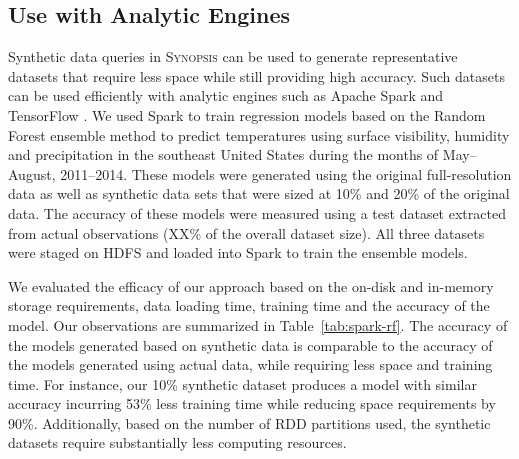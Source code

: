 \subsection{Use with Analytic Engines}
Synthetic data queries in \textsc{Synopsis} can be used to generate representative datasets that require less space while still providing high accuracy.  
Such datasets can be used efficiently with analytic engines such as Apache Spark \cite{zaharia2010spark} and TensorFlow \cite{tensorflow}.  
We used Spark to train regression models based on the Random Forest ensemble method to predict temperatures using surface visibility, humidity and precipitation in the southeast United States during the months of May--August, 2011--2014.
These models were generated using the original full-resolution data as well as synthetic data sets that were sized at 10\% and 20\% of the original data.
The accuracy of these models were measured using a test dataset extracted from actual observations (XX\% of the overall dataset size).
All three datasets were staged on HDFS and loaded into Spark to train the ensemble models.

We evaluated the efficacy of our approach based on the on-disk and in-memory storage requirements, data loading time, training time and the accuracy of the model.
Our observations are summarized in Table~\ref{tab:spark-rf}.
The accuracy of the models generated based on synthetic data is comparable to the accuracy of the models generated using actual data, while requiring less space and training time.
For instance, our 10\% synthetic dataset produces a model with similar accuracy incurring 53\% less training time while reducing space requirements by 90\%. Additionally, based on the number of RDD partitions used, the synthetic datasets require substantially less computing resources.

